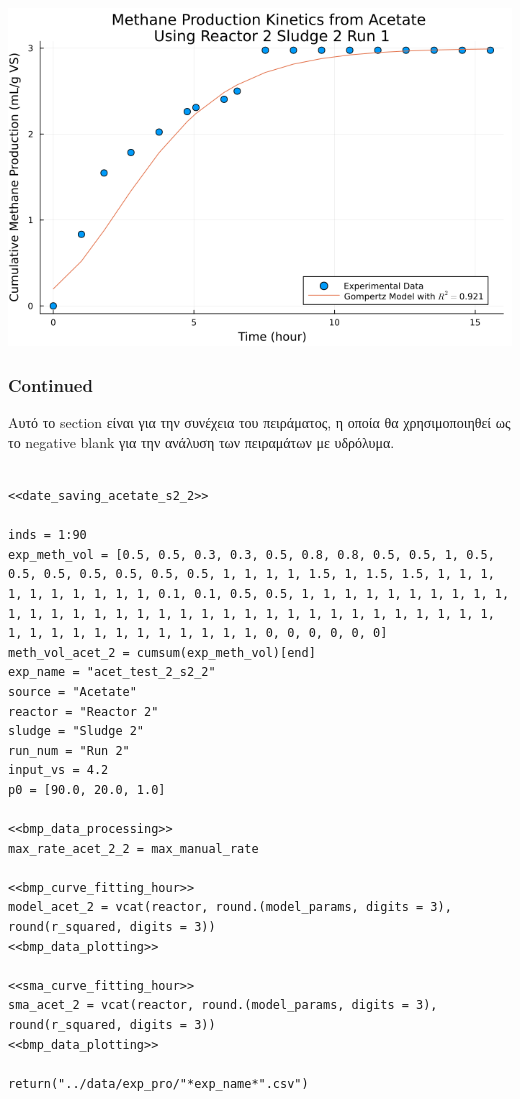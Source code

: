 \documentclass[11pt]{article}
\begin{document}
\begin{center}
\includegraphics[width=.9\linewidth]{../plots/BMPs/Acetate/specific_methane_kinetics_acet_test_2_s2_min.png}
\end{center}

\subsubsection{Continued}
\label{sec:orgf032bd4}
Αυτό το section είναι για την συνέχεια του πειράματος, η οποία θα χρησιμοποιηθεί ως το negative blank για την ανάλυση των πειραμάτων με υδρόλυμα.

\begin{verbatim}

<<date_saving_acetate_s2_2>>

inds = 1:90
exp_meth_vol = [0.5, 0.5, 0.3, 0.3, 0.5, 0.8, 0.8, 0.5, 0.5, 1, 0.5, 0.5, 0.5, 0.5, 0.5, 0.5, 0.5, 1, 1, 1, 1, 1.5, 1, 1.5, 1.5, 1, 1, 1, 1, 1, 1, 1, 1, 1, 1, 0.1, 0.1, 0.5, 0.5, 1, 1, 1, 1, 1, 1, 1, 1, 1, 1, 1, 1, 1, 1, 1, 1, 1, 1, 1, 1, 1, 1, 1, 1, 1, 1, 1, 1, 1, 1, 1, 1, 1, 1, 1, 1, 1, 1, 1, 1, 1, 1, 1, 1, 1, 0, 0, 0, 0, 0, 0]
meth_vol_acet_2 = cumsum(exp_meth_vol)[end]
exp_name = "acet_test_2_s2_2"
source = "Acetate"
reactor = "Reactor 2"
sludge = "Sludge 2"
run_num = "Run 2"
input_vs = 4.2
p0 = [90.0, 20.0, 1.0]

<<bmp_data_processing>>
max_rate_acet_2_2 = max_manual_rate

<<bmp_curve_fitting_hour>>
model_acet_2 = vcat(reactor, round.(model_params, digits = 3), round(r_squared, digits = 3))
<<bmp_data_plotting>>

<<sma_curve_fitting_hour>>
sma_acet_2 = vcat(reactor, round.(model_params, digits = 3), round(r_squared, digits = 3))  
<<bmp_data_plotting>>

return("../data/exp_pro/"*exp_name*".csv")

\end{verbatim}
\end{document}
